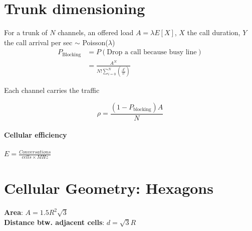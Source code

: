 \documentclass[10pt, a4paper,twocolumn]{scrartcl}
\begin{document}
\section{Trunk dimensioning}
For a trunk of $N$ channels, an offered load $A=\lambda E[X]$, $X$ the call duration, $Y$ the call arrival per sec $\sim$ Poisson($\lambda$) 
\begin{align*}
	P_\textrm{Blocking} &= P(\textrm{Drop a call because busy line})  \\
	&= \frac{A^N}{N!\sum^N_{i=0}(\frac{A^i}{i!})}
\end{align*}

Each channel carries the traffic 

\begin{equation*}
	\rho = \frac{(1 - P_\textrm{blocking})A}{N}
\end{equation*}

\paragraph{Cellular efficiency} $E = \frac{Conversations}{cells\times MHz}$

\section{Cellular Geometry: Hexagons}

\textbf{Area}: $A=1.5R^2\sqrt{3}$\\
\textbf{Distance btw. adjacent cells}: $d=\sqrt{3}R$
\end{document}
